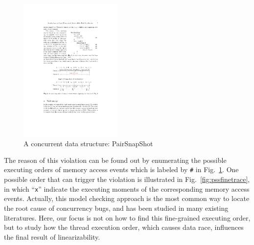 \documentclass[runningheads]{llncs}
\begin{document}
    \begin{figure}
\centering

   \includegraphics[width = 2in]{pss.pdf}
        \caption{A concurrent data structure: PairSnapShot}
        \label{fig:pairsnapshot}
\end{figure}


The reason of this violation can be found out by enumerating the possible executing orders of memory access events which is labeled by \texttt{\#} in Fig.~\ref{fig:pairsnapshot}. 
One possible order that can trigger the violation is illustrated in Fig.~\ref{fig:pssfinetrace}, in which ``\texttt{x}'' indicate the executing moments of the corresponding memory access events. 
Actually, this model checking approach is the most common way to locate the root cause of concurrency bugs, and has been studied in many existing literatures.
Here, our focus is not on how to find this fine-grained executing order, but to study how the thread execution order, which causes data race, influences the final result of linearizability.
\end{document}
